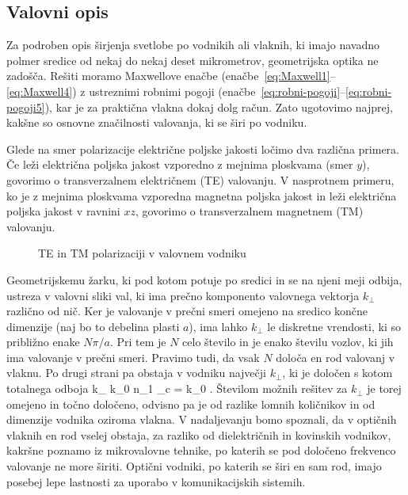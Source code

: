 \subsection{Valovni opis}
Za podroben opis širjenja svetlobe po vodnikih ali vlaknih, 
ki imajo navadno polmer
sredice od nekaj do nekaj deset mikrometrov, geometrijska optika ne
zadošča. Rešiti moramo Maxwellove enačbe (enačbe~\ref{eq:Maxwell1}--\ref{eq:Maxwell4}) 
z ustreznimi robnimi pogoji (enačbe~\ref{eq:robni-pogoji}--\ref{eq:robni-pogoji5}),
kar je za praktična vlakna dokaj dolg račun. Zato ugotovimo najprej, kakšne
so osnovne značilnosti valovanja, ki se širi po vodniku.

Glede na smer polarizacije električne poljske jakosti 
ločimo dva različna primera. Če leži električna poljska
jakost vzporedno z mejnima ploskvama (smer $y$), 
govorimo o transverzalnem električnem (TE) valovanju. 
V nasprotnem primeru, ko je 
z mejnima ploskvama vzporedna magnetna poljska jakost in 
leži električna poljska jakost v ravnini $xz$, 
govorimo o transverzalnem magnetnem (TM) valovanju.
\begin{figure}[h]
\centering
\def\svgwidth{120truemm} 

\caption{TE in TM polarizaciji v valovnem vodniku}
\label{fig:TETM}
\end{figure}

Geometrijskemu žarku, ki pod kotom potuje po sredici in se na njeni meji
odbija, ustreza v valovni sliki val, ki ima prečno komponento valovnega
vektorja $k_{\perp}$ različno od nič. Ker je valovanje v prečni smeri 
omejeno na sredico končne dimenzije (naj bo to debelina plasti $a$), ima lahko
$k_{\perp}$ le diskretne vrendosti, ki so približno enake $N\pi/a$. Pri 
tem je $N$ celo število in je enako številu vozlov, ki jih ima valovanje v prečni smeri.
Pravimo tudi, da vsak $N$ določa en rod valovanj v vlaknu. Po drugi strani 
pa obstaja v vodniku največji $k_\perp$, ki je določen 
s kotom totalnega odboja 
\beq
k_{\perp {}} \approx k_0 n_1 \cos\vartheta_c = k_0 .
\eeq
Številom možnih rešitev za $k_\perp$ je torej omejeno in točno določeno, odvisno
pa je od razlike lomnih količnikov in od dimenzije vodnika oziroma vlakna. 
V nadaljevanju bomo spoznali, da v optičnih vlaknih en rod vselej obstaja,
za razliko od dielektričnih in kovinskih vodnikov, kakršne
poznamo iz mikrovalovne tehnike, po katerih se pod določeno frekvenco
valovanje ne more širiti. Optični vodniki, po katerih se širi
en sam rod, imajo posebej lepe lastnosti za uporabo v komunikacijskih
sistemih.

